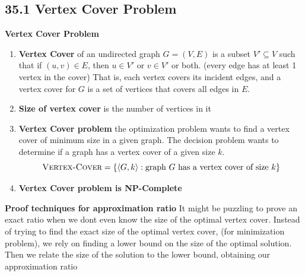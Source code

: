 \documentclass[11pt]{article}
\begin{document}
\subsection*{35.1 Vertex Cover Problem} 

\begin{defn*}
    \textbf{Vertex Cover Problem}
    \begin{enumerate}
        \item \textbf{Vertex Cover} of an undirected graph $G = (V,E)$ is a subset $V' \subseteq V$ such that if $(u,v)\in E$, then $u\in V'$ or $v\in V'$ or both. (every edge has at least 1 vertex in the cover) That is, each vertex covers its incident edges, and a vertex cover for $G$ is a set of vertices that covers all edges in $E$.
        \item \textbf{Size of vertex cover} is the number of vertices in it 
        \item \textbf{Vertex Cover problem} the optimization problem wants to find a vertex cover of minimum size in a given graph. The decision problem wants to determine if a graph has a vertex cover of a given size $k$. 
        \[
            \textsc{Vertex-Cover} = \{\langle G, k\rangle : \text{graph $G$ has a vertex cover of size $k$} \}
        \]
        \item \textbf{Vertex Cover problem is NP-Complete}
    \end{enumerate}
\end{defn*}

\begin{defn*}
    \textbf{Proof techniques for approximation ratio} It might be puzzling to prove an exact ratio when we dont even know the size of the optimal vertex cover. Instead of trying to find the exact size of the optimal vertex cover, (for minimization problem), we rely on finding a lower bound on the size of the optimal solution. Then we relate the size of the solution to the lower bound, obtaining our approximation ratio
\end{defn*}
\end{document}
